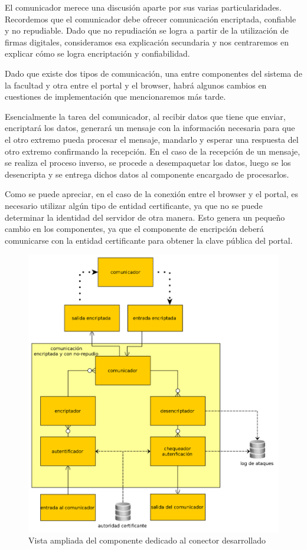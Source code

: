 El comunicador merece una discusión aparte por sus varias particularidades. Recordemos que el comunicador debe ofrecer comunicación encriptada, confiable y no repudiable. Dado que no repudiación se logra a partir de la utilización de firmas digitales, consideramos esa explicación secundaria y nos centraremos en explicar cómo se logra encriptación y confiabilidad.

Dado que existe dos tipos de comunicación, una entre componentes del sistema de la facultad y otra entre el portal y el browser, habrá algunos cambios en cuestiones de implementación que mencionaremos más tarde. %

Esencialmente la tarea del comunicador, al recibir datos que tiene que enviar, encriptará los datos, generará un mensaje con la información necesaria para que el otro extremo pueda procesar el mensaje, mandarlo y esperar una respuesta del otro extremo confirmando la recepción.
En el caso de la recepción de un mensaje, se realiza el proceso inverso, se procede a desempaquetar los datos, luego se los desencripta y se entrega dichos datos al componente encargado de procesarlos.

Como se puede apreciar, en el caso de la conexión entre el browser y el portal, es necesario utilizar algún tipo de entidad certificante, ya que no se puede determinar la identidad del servidor de otra manera. Esto genera un pequeño cambio en los componentes, ya que el componente de encripción deberá comunicarse con la entidad certificante para obtener la clave pública del portal.

\begin{figure}[H]
	\begin{center}
		\includegraphics[scale=0.26]{../diagramas/conector.png}
		\caption{Vista ampliada del componente dedicado al conector desarrollado}
	\end{center} 
\end{figure} 

